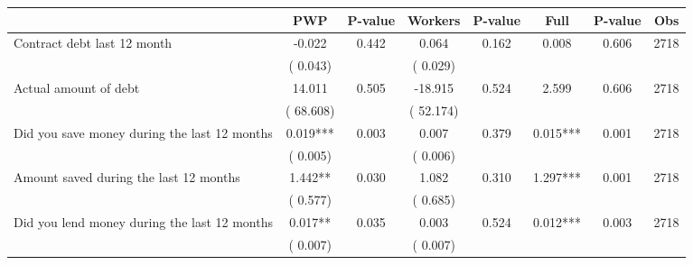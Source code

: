 
\begin{tabular}{l*{7}{c}}\hline&\multicolumn{1}{c}{PWP}&\multicolumn{1}{c}{P-value}&\multicolumn{1}{c}{Workers}&\multicolumn{1}{c}{P-value}&\multicolumn{1}{c}{Full}&\multicolumn{1}{c}{P-value}&\multicolumn{1}{c}{Obs} \\ \hline

 Contract debt last 12 month       &             -0.022       &        0.442  &              0.064       &        0.162  &              0.008       &              0.606 &  2718 \\ 
                       &       (       0.043)             &                               &       (       0.029)                     &                               &                                               &                                &                      \\ 

 Actual amount of debt       &             14.011       &        0.505  &            -18.915       &        0.524  &              2.599       &              0.606 &  2718 \\ 
                       &       (      68.608)             &                               &       (      52.174)                     &                               &                                               &                                &                      \\ 

 Did you save money during the last 12 months       &              0.019***       &        0.003  &              0.007       &        0.379  &              0.015***       &              0.001 &  2718 \\ 
                       &       (       0.005)             &                               &       (       0.006)                     &                               &                                               &                                &                      \\ 

 Amount saved during the last 12 months       &              1.442**       &        0.030  &              1.082       &        0.310  &              1.297***       &              0.001 &  2718 \\ 
                       &       (       0.577)             &                               &       (       0.685)                     &                               &                                               &                                &                      \\ 

 Did you lend money during the last 12 months       &              0.017**       &        0.035  &              0.003       &        0.524  &              0.012***       &              0.003 &  2718 \\ 
                       &       (       0.007)             &                               &       (       0.007)                     &                               &                                               &                                &                      \\ 

\hline \end{tabular}